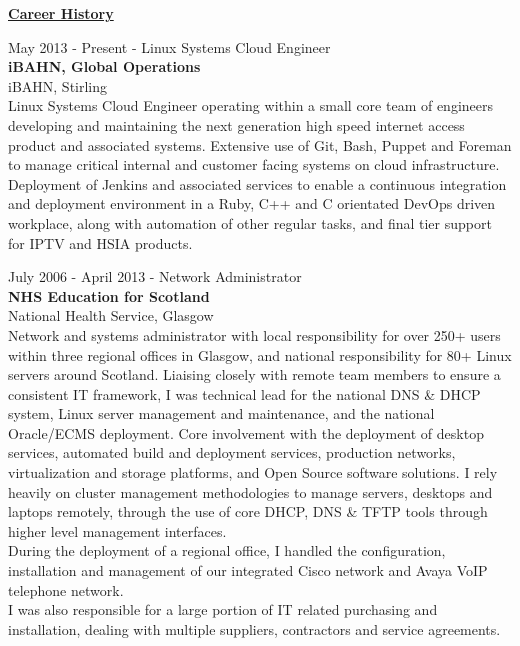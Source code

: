 \documentclass[10pt]{report}
\begin{document}
\clearpage 

\begin{flushleft}
\bf{\underline{Career History}}\\
\end{flushleft}

\begin{flushleft}
May 2013 - Present - Linux Systems Cloud Engineer\\
{\bf iBAHN, Global Operations}\\
iBAHN, Stirling\\
Linux Systems Cloud Engineer operating within a small core team of engineers developing and maintaining the next generation high speed internet access product and associated systems. Extensive use of Git, Bash, Puppet and Foreman to manage critical internal and customer facing systems on cloud infrastructure. Deployment of Jenkins and associated services to enable a continuous integration and deployment environment in a Ruby, C++ and C orientated DevOps driven workplace, along with automation of other regular tasks, and final tier support for IPTV and HSIA products.\\
\end{flushleft}

\begin{flushleft}
July 2006 - April 2013 - Network Administrator\\
{\bf NHS Education for Scotland}\\
National Health Service, Glasgow\\
Network and systems administrator with local responsibility for over 250+ users within three regional offices in Glasgow, and national responsibility for 80+ Linux servers around Scotland. Liaising closely with remote team members to ensure a consistent IT framework, I was technical lead for the national DNS \& DHCP system, Linux server management and maintenance, and the national Oracle/ECMS deployment. Core involvement with the deployment of desktop services, automated build and deployment services, production networks, virtualization and storage platforms, and Open Source software solutions. I rely heavily on cluster management methodologies to manage servers, desktops and laptops remotely, through the use of core DHCP, DNS \& TFTP tools through higher level management interfaces.\\
During the deployment of a regional office, I handled the configuration, installation and management of our integrated Cisco network and Avaya VoIP telephone network.\\ I was also responsible for a large portion of IT related purchasing and installation, dealing with multiple suppliers, contractors and service agreements.
\end{flushleft}
\end{document}
